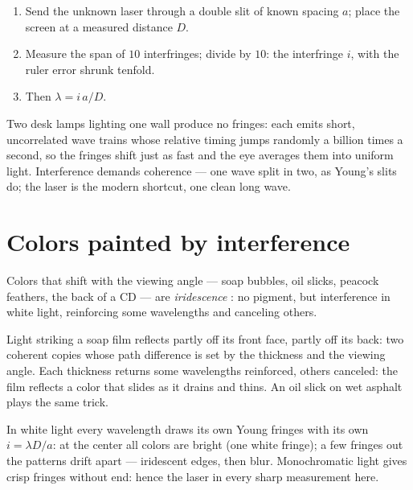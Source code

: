 \begin{method}\label{met:g12:light-as-wave:lambda}
\begin{enumerate}
  \item Send the unknown laser through a double slit of known spacing
        $a$; place the screen at a measured distance $D$.
  \item Measure the span of $10$ interfringes; divide by $10$: the
        interfringe $i$, with the ruler error shrunk tenfold.
  \item Then $\lambda = i\,a/D$.
\end{enumerate}
\end{method}

\begin{remark}\label{rem:g12:light-as-wave:lamps}
Two desk lamps lighting one wall produce no fringes: each emits
short, uncorrelated wave trains whose relative timing jumps randomly
a billion times a second, so the fringes shift just as fast and the
eye averages them into uniform light. Interference demands coherence
--- one wave split in two, as Young's slits do; the laser is the
modern shortcut, one clean long wave.
\end{remark}

\section{Colors painted by interference}

\begin{definition}[Iridescence]\label{def:g12:light-as-wave:iridescence}
Colors that shift with the viewing angle --- soap bubbles, oil slicks,
peacock feathers, the back of a CD --- are \emph{iridescence}%
: no pigment, but interference in white light,
reinforcing some wavelengths and canceling others.
\end{definition}

\begin{example}\label{ex:g12:light-as-wave:soap}
Light striking a soap film reflects partly off its front face, partly
off its back: two coherent copies whose path difference is set by the
thickness and the viewing angle. Each thickness returns some
wavelengths reinforced, others canceled: the film reflects a color
that slides as it drains and thins. An oil slick on wet asphalt plays
the same trick.
\end{example}

\begin{remark}\label{rem:g12:light-as-wave:white}
In white light every wavelength draws its own Young fringes with its
own $i = \lambda D/a$: at the center all colors are bright (one white
fringe); a few fringes out the patterns drift apart --- iridescent
edges, then blur. Monochromatic light gives crisp fringes without
end: hence the laser in every sharp measurement here.
\end{remark}

